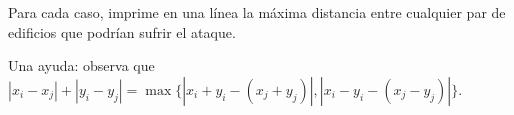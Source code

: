 Para cada caso, imprime en una línea la máxima distancia entre cualquier par de
edificios que podrían sufrir el ataque.

\exampleCases

\begin{example}
\end{example}

\explanationText

Una ayuda: observa
que~$|x_i - x_j| + |y_i - y_j| = \max \{|x_i + y_i - (x_j + y_j)|, |x_i - y_i - (x_j -
y_j)| \}$.
